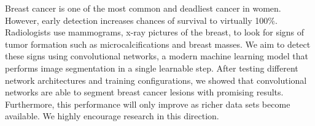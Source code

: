 Breast cancer is one of the most common and deadliest cancer in women.
However, early detection increases chances of survival to virtually 100\%.
Radiologists use mammograms, x-ray pictures of the breast, to look for signs of tumor formation such as microcalcifications and breast masses.
We aim to detect these signs using convolutional networks, a modern machine learning model that performs image segmentation in a single learnable step. After testing different network architectures and training configurations, we showed that convolutional networks are able to segment breast cancer lesions with promising results. Furthermore, this performance will only improve as richer data sets become available. We highly encourage research in this direction.

